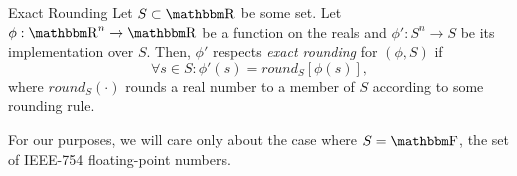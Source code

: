 \documentclass[11pt]{scrartcl} %
\begin{document}
\begin{definition}
	\label{defn:exact_rounding}
	Exact Rounding \newline
	Let $S \subset \R$ be some set.
	Let $\phi: \R^n \rightarrow \R$ be a function on the reals and $\phi': S^n \rightarrow S$ be its implementation over $S$.
	Then, $\phi'$ respects \emph{exact rounding} for $(\phi, S)$ if
	\[ \forall s \in S: \phi'(s) = round_{S}[\phi(s)], \]
	where $round_{S}(\cdot)$ rounds a real number to a member of $S$ according to some rounding rule.
\end{definition}
For our purposes, we will care only about the case where $S = \F$, the set of IEEE-754 floating-point numbers.



\end{document}
